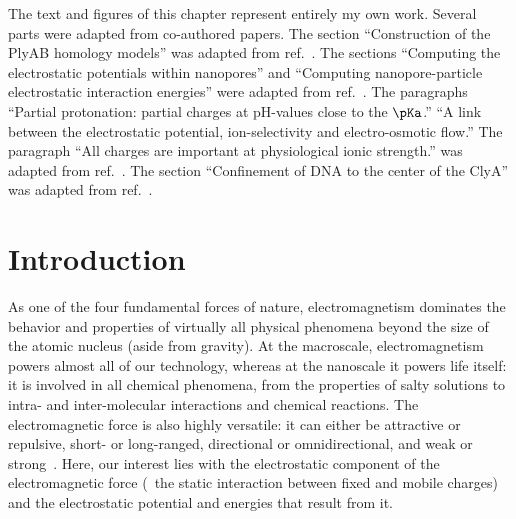 %
The text and figures of this chapter represent entirely my own work. Several parts were adapted from
co-authored papers.
%
The section
%
``Construction of the PlyAB homology models''
%
was adapted from ref.~\cite{Huang-2020}.
%
%
The sections
%
``Computing the electrostatic potentials within nanopores''
%
and
%
``Computing nanopore-particle electrostatic interaction energies''
%
were adapted from ref.~\cite{Willems-Ruic-Biesemans-2019}.
%
%
The paragraphs
%
``Partial protonation: partial charges at pH-values close to the $\pKa$.''
%
``A link between the electrostatic potential, ion-selectivity and electro-osmotic flow.''
%
%
The paragraph 
%
``All charges are important at physiological ionic strength.''
%
was adapted from ref.~\cite{Franceschini-2016}.
%
%
The section
%
``Confinement of DNA to the center of the ClyA''
%
was adapted from ref.~\cite{Bayoumi-2020}.
%

%
%
\cleardoublepage
%
%





%
\section{Introduction}
%
\label{sec:elec:intro}
%

As one of the four fundamental forces of nature, electromagnetism dominates the behavior and properties of
virtually all physical phenomena beyond the size of the atomic nucleus (aside from gravity). At the
macroscale, electromagnetism powers almost all of our technology, whereas at the nanoscale it powers life
itself: it is involved in all chemical phenomena, from the properties of salty solutions to intra- and
inter-molecular interactions and chemical reactions. The electromagnetic force is also highly versatile: it
can either be attractive or repulsive, short- or long-ranged, directional or omnidirectional, and weak or
strong~\cite{Walker-2011}. Here, our interest lies with the electrostatic component of the electromagnetic
force (\ie~the static interaction between fixed and mobile charges) and the electrostatic potential and
energies that result from it.

